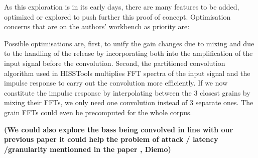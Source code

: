 As this exploration is in its early days, there are many features to be added, optimized or explored to push further this proof of concept. Optimisation concerns that are on the authors' workbench as priority are:

Possible optimisations are, first, to unify the gain changes due to mixing and due to the handling of the release by incorporating both into the amplification of the input signal before the convolution.
Second, the partitioned convolution algorithm used in HISSTools multiplies FFT spectra of the input signal and the impulse response to carry out the convolution more efficiently.  If we now constitute the impulse response by interpolating between the 3 closest grains by mixing their FFTs, we only need one convolution instead of 3 separate ones.  The grain FFTs could even be precomputed for the whole corpus. %


\textbf{(We could also explore the bass being convolved in line with our previous paper it could help the problem of attack / latency /granularity mentionned in the paper \cite{TremblaySchwarz-nime2010-surfing-the-waves}, Diemo)}
